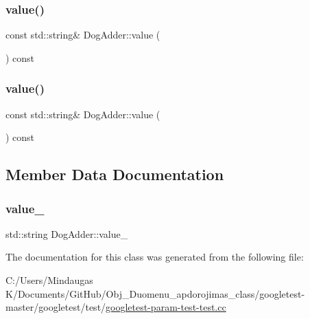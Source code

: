 \mbox{\label{class_dog_adder_a76bb9e42f79e9d4adacd9e48a3a3c9fb}} 
\subsubsection{\texorpdfstring{value()}{value()}\hspace{0.1cm}{\footnotesize\ttfamily [2/3]}}
{\footnotesize\ttfamily const std\+::string\& Dog\+Adder\+::value (\begin{DoxyParamCaption}{ }\end{DoxyParamCaption}) const\hspace{0.3cm}{\ttfamily [inline]}}

\mbox{\label{class_dog_adder_a76bb9e42f79e9d4adacd9e48a3a3c9fb}} 
\subsubsection{\texorpdfstring{value()}{value()}\hspace{0.1cm}{\footnotesize\ttfamily [3/3]}}
{\footnotesize\ttfamily const std\+::string\& Dog\+Adder\+::value (\begin{DoxyParamCaption}{ }\end{DoxyParamCaption}) const\hspace{0.3cm}{\ttfamily [inline]}}



\subsection{Member Data Documentation}
\mbox{\label{class_dog_adder_ac539b2207c940d290ed9b88211badce9}} 
\subsubsection{\texorpdfstring{value\_}{value\_}}
{\footnotesize\ttfamily std\+::string Dog\+Adder\+::value\+\_\+\hspace{0.3cm}{\ttfamily [private]}}



The documentation for this class was generated from the following file\+:\begin{DoxyCompactItemize}
\item 
C\+:/\+Users/\+Mindaugas K/\+Documents/\+Git\+Hub/\+Obj\+\_\+\+Duomenu\+\_\+apdorojimas\+\_\+class/googletest-\/master/googletest/test/\mbox{\hyperlink{googletest-master_2googletest_2test_2googletest-param-test-test_8cc}{googletest-\/param-\/test-\/test.\+cc}}\end{DoxyCompactItemize}

